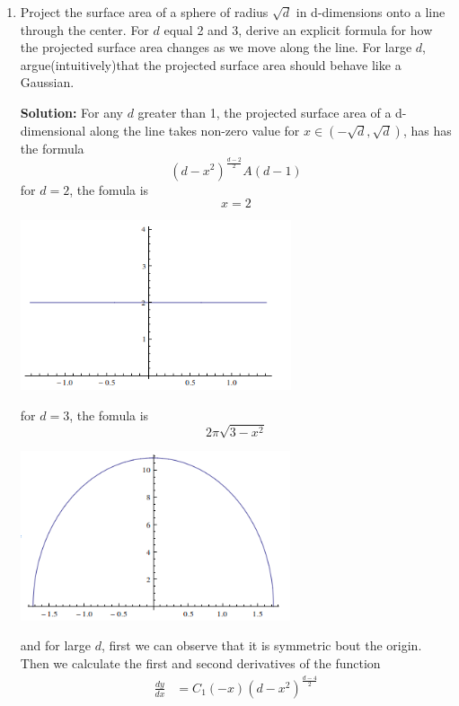 \documentclass[a4paper, 12pt]{mcshw}
\begin{document}
    \begin{enumerate}
        \item Project the surface area of a sphere of radius $\sqrt{d}$ in d-dimensions onto a line through the center. For $d$ equal 2 and 3, derive an explicit formula for how the projected surface area changes as we move along the line. For large $d$, argue(intuitively)that the projected surface area should behave like a Gaussian.


            \textbf{Solution:} For any $d$ greater than 1, the projected surface area of a d-dimensional along the line takes non-zero value for $x \in (-\sqrt{d},\sqrt{d})$, has has the formula 
            $$
            {(d - x^2)}^{\frac{d-2}{2}}A(d-1)
            $$
            for $d=2$, the fomula is
            $$
            x=2
            $$
            \begin{center}
                \includegraphics[height=5cm]{1.png}
            \end{center}
            for $d=3$, the fomula is
            $$
            2\pi\sqrt{3 - x^2}
            $$
            \begin{center}
                \includegraphics[height=5cm]{2.png}
            \end{center}
            and for large $d$, first we can observe that it is symmetric bout the origin. Then we calculate the first and second derivatives of the function
            \begin{align}
                \frac{dy}{dx}&=C_1(-x){(d-x^2)}^{\frac{d-4}{2}}\\

\end{align}
\end{enumerate}
\end{document}
